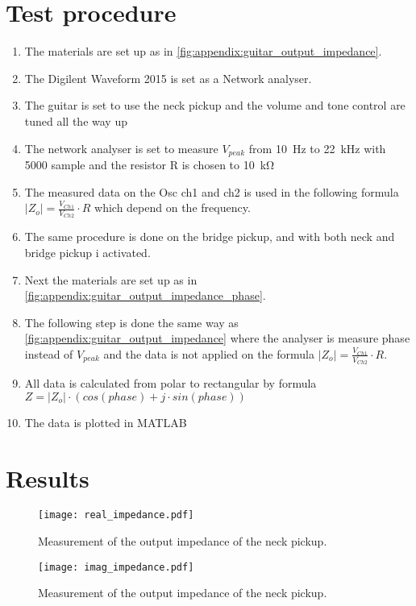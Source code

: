 \newpage

\section*{Test procedure}


\begin{enumerate}
\item The materials are set up as in \autoref{fig:appendix:guitar_output_impedance}.
\item The Digilent Waveform 2015 is set as a Network analyser.
\item  The guitar is set to use the neck pickup and the volume and tone control are tuned all the way up
\item  The network analyser is set to measure $V_{peak}$ from \SI{10}{\hertz} to \SI{22}{\kilo\hertz} with 5000 sample and the resistor R is chosen to \SI{10}{\kilo\ohm}
\item The measured data on the Osc ch1 and ch2 is used in the following formula $\left | Z_o \right | = \frac{V_{Ch1}}{V_{Ch2}}\cdot R$ which depend on the frequency. 
\item The same procedure is done on the bridge pickup, and with both neck and bridge pickup i activated.
\item Next the materials are set up as in \autoref{fig:appendix:guitar_output_impedance_phase}.
\item The following step is done the same way as \autoref{fig:appendix:guitar_output_impedance} where the analyser is measure phase instead of $V_{peak}$ and the data is not applied on the formula $\left | Z_o \right | = \frac{V_{Ch1}}{V_{Ch2}}\cdot R$.
\item All data is calculated from polar to rectangular by formula $Z=\left | Z_o \right | \cdot (cos(phase) + j \cdot sin(phase))$
\item The data is plotted in MATLAB
\end{enumerate}

\newpage
\section*{Results}

\begin{figure}[htbp!]
	\centering
		\texttt{[image: real\_impedance.pdf]}
		\caption{Measurement of the output impedance of the neck pickup.}
		\label{fig:appendix:real_impedance}
		\texttt{[image: imag\_impedance.pdf]}
		\caption{Measurement of the output impedance of the neck pickup.}
		\label{fig:appendix:real_impedance}
\end{figure}

